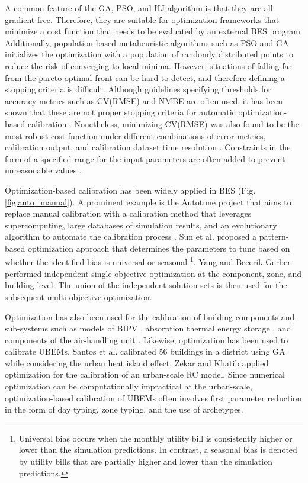 \documentclass[review]{elsarticle}
\begin{document}
A common feature of the GA, PSO, and HJ algorithm is that they are all gradient-free. Therefore, they are suitable for optimization frameworks that minimize a cost function that needs to be evaluated by an external BES program. Additionally, population-based metaheuristic algorithms such as PSO and GA initializes the optimization with a population of randomly distributed points to reduce the risk of converging to local minima. However, situations of falling far from the pareto-optimal front can be hard to detect, and therefore defining a stopping criteria is difficult. Although guidelines \cite{ashrae2014guideline, evo2012international, femp2015guidelines} specifying thresholds for accuracy metrics such as CV(RMSE) and NMBE are often used, it has been shown that these are not proper stopping criteria for automatic optimization-based calibration \cite{martinez2020performance}. Nonetheless, minimizing CV(RMSE) was also found to be the most robust cost function under different combinations of error metrics, calibration output, and calibration dataset time resolution \cite{martinez2020performance}. Constraints in the form of a specified range for the input parameters are often added to prevent unreasonable values \cite{qiu2018quick}.  

Optimization-based calibration has been widely applied in BES (Fig. \ref{fig:auto_manual}). A prominent example is the Autotune project that aims to replace manual calibration with a calibration method that leverages supercomputing, large databases of simulation results, and an evolutionary algorithm to automate the calibration process \cite{chaudhary2016evaluation, garrett2015scalable}. Sun et al. \cite{sun2016pattern} proposed a pattern-based optimization approach that determines the parameters to tune based on whether the identified bias is universal or seasonal \footnote{Universal bias occurs when the monthly utility bill is consistently higher or lower than the simulation predictions. In contrast, a seasonal bias is denoted by utility bills that are partially higher and lower than the simulation predictions.}. Yang and Becerik-Gerber \cite{yang2015model} performed independent single objective optimization at the component, zone, and building level. The union of the independent solution sets is then used for the subsequent multi-objective optimization. 

Optimization has also been used for the calibration of building components and sub-systems such as models of BIPV \cite{Ha2020parameter}, absorption thermal energy storage \cite{schreiber2018predicting}, and components of the air-handling unit \cite{larochellemartin2019energy}. Likewise, optimization has been used to calibrate UBEMs. Santos et al. \cite{santos2018evaluating} calibrated 56 buildings in a district using GA while considering the urban heat island effect. Zekar and Khatib \cite{zekar2018development} applied optimization for the calibration of an urban-scale RC model. Since numerical optimization can be computationally impractical at the urban-scale, optimization-based calibration of UBEMs often involves first parameter reduction in the form of day typing, zone typing, and the use of archetypes. 
\end{document}

